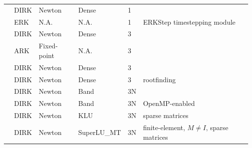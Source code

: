 \documentclass[letterpaper,10pt,english]{sphinxmanual}
\begin{document}
\begin{savenotes}\sphinxattablestart
\centering
\begin{tabulary}{\linewidth}[t]{|T|T|T|T|T|T|}
\hline
{}\relax &\relax &\relax &\relax &\relax &\relax \\
\hline
{\hyperref[\detokenize{c_serial:ark-analytic}]{}}
&
DIRK
&
Newton
&
Dense
&
1
&\\
\hline
{\hyperref[\detokenize{c_serial:ark-analytic-nonlin}]{}}
&
ERK
&
N.A.
&
N.A.
&
1
&
ERKStep timestepping module
\\
\hline
{\hyperref[\detokenize{c_serial:ark-brusselator}]{}}
&
DIRK
&
Newton
&
Dense
&
3
&\\
\hline
{\hyperref[\detokenize{c_serial:ark-brusselator-fp}]{}}
&
ARK
&
Fixed-point
&
N.A.
&
3
&\\
\hline
{\hyperref[\detokenize{c_serial:ark-robertson}]{}}
&
DIRK
&
Newton
&
Dense
&
3
&\\
\hline
{\hyperref[\detokenize{c_serial:ark-robertson-root}]{}}
&
DIRK
&
Newton
&
Dense
&
3
&
rootfinding
\\
\hline
{\hyperref[\detokenize{c_serial:ark-brusselator1d}]{}}
&
DIRK
&
Newton
&
Band
&
3N
&\\
\hline
{\hyperref[\detokenize{c_openmp:ark-brusselator1d-omp}]{}}
&
DIRK
&
Newton
&
Band
&
3N
&
OpenMP-enabled
\\
\hline
{\hyperref[\detokenize{c_serial:ark-brusselator1d-klu}]{}}
&
DIRK
&
Newton
&
KLU
&
3N
&
sparse matrices
\\
\hline
{\hyperref[\detokenize{c_serial:ark-brusselator1d-fem-slu}]{}}
&
DIRK
&
Newton
&
SuperLU\_MT
&
3N
&
finite-element, \(M\ne I\), sparse matrices

\end{tabulary}
\end{savenotes}
\end{document}
